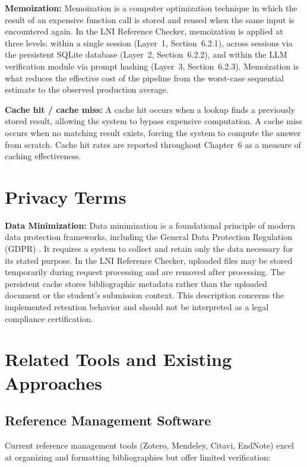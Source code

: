 \documentclass[12pt,a4paper,oneside]{report}
\begin{document}
\textbf{Memoization:} Memoization is a computer optimization 
technique in which the result of an expensive function call is stored 
and reused when the same input is encountered again. In the LNI 
Reference Checker, memoization is applied at three levels: within a 
single session (Layer~1, Section~6.2.1), across sessions via the 
persistent SQLite database (Layer~2, Section~6.2.2), and within the 
LLM verification module via prompt hashing (Layer~3, Section~6.2.3). 
Memoization is what reduces the effective cost of the pipeline from 
the worst-case sequential estimate to the observed production 
average.

\textbf{Cache hit / cache miss:} A cache hit occurs when a lookup 
finds a previously stored result, allowing the system to bypass 
expensive computation. A cache miss occurs when no matching result 
exists, forcing the system to compute the answer from scratch. Cache 
hit rates are reported throughout Chapter~6 as a measure of caching 
effectiveness.

\section{Privacy Terms}

\textbf{Data Minimization:} Data minimization is a foundational 
principle of modern data protection frameworks, including the General 
Data Protection Regulation (GDPR) \cite{gdpr2016}. It requires a system 
to collect and retain only the data necessary for its stated purpose. In 
the LNI Reference Checker, uploaded files may be stored temporarily during 
request processing and are removed after processing. The persistent cache 
stores bibliographic metadata rather than the uploaded document or the 
student's submission context. This description concerns the implemented 
retention behavior and should not be interpreted as a legal compliance 
certification.

\section{Related Tools and Existing Approaches}

\subsection{Reference Management Software}

Current reference management tools (Zotero, Mendeley, Citavi, EndNote) excel 
at organizing and formatting bibliographies but offer limited verification:
\end{document}
